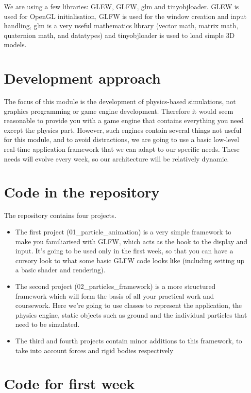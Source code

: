 \documentclass[12pt]{article}
\begin{document}
We are using a few libraries: GLEW, GLFW, glm and tinyobjloader. GLEW is used for OpenGL initialisation, GLFW is used for the window creation and input handling, glm is a very useful mathematics library (vector math, matrix math, quaternion math, and datatypes) and tinyobjloader is used to load simple 3D models.

\section*{Development approach}

The focus of this module is the development of physics-based simulations, not graphics programming or game engine development. Therefore it would seem reasonable to provide you with a game engine that contains everything you need except the physics part. However, such engines contain several things not useful for this module, and to avoid distractions, we are going to use a basic low-level real-time application framework that we can adapt to our specific needs. These needs will evolve every week, so our architecture will be relatively dynamic.

\section*{Code in the repository}

The repository contains four projects. 

\begin{itemize}
\item The first project (01\_particle\_animation) is a very simple framework to make you familiarised with GLFW, which acts as the hook to the display and input. It's going to be used only in the first week, so that you can have a cursory look to what some basic GLFW code looks like (including setting up a basic shader and rendering). 
\item The second project (02\_particles\_framework) is a more structured framework which will form the basis of all your practical work and coursework. Here we're going to use classes to represent the application, the physics engine, static objects such as ground and the individual particles that need to be simulated. 
\item The third and fourth projects contain minor additions to this framework, to take into account forces and rigid bodies respectively
\end{itemize}

\section*{Code for first week}
\end{document}
